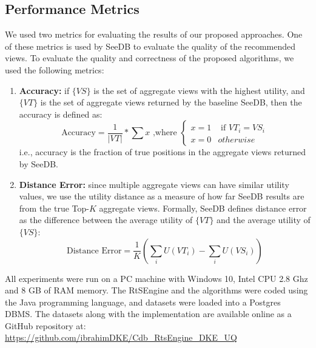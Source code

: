 \subsection{Performance Metrics}
%
We used two metrics for evaluating the results of our proposed approaches.
%
One of these metrics is used by SeeDB \cite{DBLP:journals/pvldb/VartakMPP14} to evaluate the quality of the recommended views. 
%
To evaluate the quality and correctness of the proposed algorithms, we used the following metrics:
%
\begin{enumerate}
%
\item \textbf{Accuracy:} if $\{VS\}$ is the set of aggregate views with the highest utility, and $\{VT\}$ is the 
set of aggregate views returned by the baseline SeeDB, then the accuracy is defined as:
\[
\text{Accuracy} = \frac{1}{|VT|} * \sum{x}  \text{   ,where  }  \begin{cases}   x = 1 & \text{ if } VT_i = VS_i \\ x = 0 & otherwise \end{cases}
\]
i.e., accuracy is the fraction of true positions in the aggregate views returned by SeeDB.
%
\item \textbf{Distance Error:} since multiple aggregate views can have similar utility values, we use the utility distance as a measure of how far SeeDB results are from the true Top-$K$ aggregate views. 
%
Formally, SeeDB \cite{vartakseedb} defines distance error as the difference between the average utility of $\{VT\}$ and the average utility of $\{VS\}$:
\[
\text{Distance Error} = \frac{1}{K} (\sum_{i}{ U(VT_i)} - \sum_{i}{U(VS_i)})
\]
%
\end{enumerate}
%

All experiments were run on a PC machine with Windows 10, Intel CPU 2.8 Ghz and 8 GB of RAM memory.
%
The RtSEngine and the algorithms were coded using the Java programming language, and datasets were loaded into a Postgres DBMS.
%
The datasets along with the implementation are available online as a GitHub repository at: \url{https://github.com/ibrahimDKE/Cdb_RtsEngine_DKE_UQ}
%
